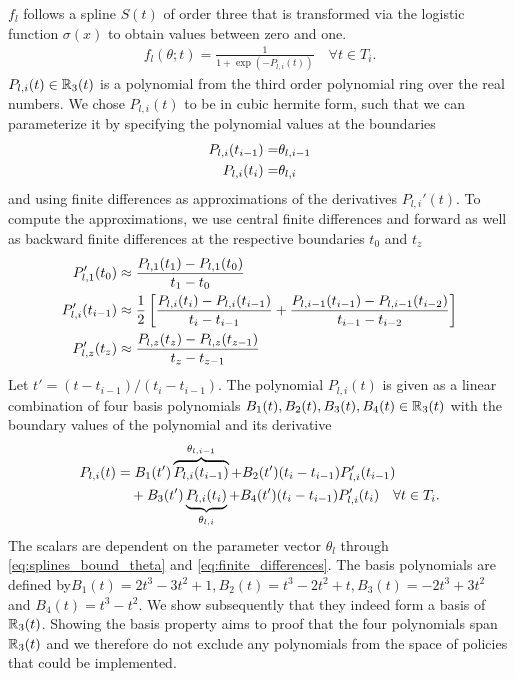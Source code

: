 $f_{l}$ follows a spline $S(t)$ of order three that is transformed via the logistic function $\sigma(x)$ to obtain values between zero and one.
\begin{align}
f_{l}(\theta; t) =  \frac{1}{1 + \exp{(-P_{l,i}(t))}} \quad \forall t \in T_i. 
\end{align}
$P_{l,i}(t) \in \mathbb{R}_3(t)$ is a polynomial from the third order polynomial ring over the real numbers. We chose $P_{l,i}(t)$ to be in cubic hermite form, such that we can parameterize it by specifying the polynomial values at the boundaries 
\begin{align}
\label{eq:splines_bound_theta}
P_{l,i}(t_{i-1}) =& \theta_{l, i-1} \\
P_{l,i}(t_{i})=& \theta_{l,i} \notag
\end{align}
and using finite differences as approximations of the derivatives $P_{l,i}'(t)$. To compute the approximations, we use central finite differences and forward as well as backward finite differences at the respective boundaries $t_0$ and $t_{z}$
\begin{align}
\label{eq:finite_differences}
P'_{l,1}(t_0) &\approx \frac{P_{l,1}(t_1) - P_{l,1}(t_0)}{t_1 - t_0} \\
P'_{l,i}(t_{i-1}) &\approx \frac{1}{2}\left[\frac{P_{l,i}(t_{i}) - P_{l,i}(t_{i-1})}{t_{i} - t_{i-1}} + \frac{P_{l,i-1}(t_{i-1}) - P_{l,i-1}( t_{i-2})}{t_{i-1} - t_{i-2}} \right] \notag \\
P'_{l,z}(t_{z}) &\approx \frac{P_{l,z}(t_{z}) - P_{l,z}(t_{z-1})}{t_{z} - t_{z-1}} \notag 
\end{align}
Let $t' = (t-t_{i-1})/(t_{i} - t_{i-1})$. The polynomial $P_{l,i}(t) $ is given as a linear combination of four basis polynomials  $B_1(t), B_2(t), B_3(t), B_4(t) \in \mathbb{R}_3(t)$ with the boundary values of the polynomial and its derivative
\begin{align}
P_{l,i}(t) &= B_1(t') \overbrace{P_{l,i}(t_{i-1})}^{\theta_{l,i-1}} + B_2(t') (t_{i} - t_{i-1}) P'_{l,i}(t_{i-1})  \\& \quad + B_3(t') \underbrace{P_{l,i}(t_{i})}_{\theta_{l,i}} + B_4(t') (t_{i} - t_{i-1}) P'_{l,i}(t_{i}) \quad \forall t \in T_i. \notag
\end{align}
The scalars are dependent on the parameter vector $\theta_l$ through \eqref{eq:splines_bound_theta} and \eqref{eq:finite_differences}. The basis polynomials are defined by$B_1(t) = 2t^3 - 3t^2 +1, B_2(t) = t^3 - 2t^2 +t, B_3(t) = -2t^3 + 3t^2$ and $B_4(t) = t^3 - t^2$. We show subsequently that they indeed form a basis of $\mathbb{R}_3(t)$. Showing the basis property aims to proof that the four polynomials span $\mathbb{R}_3(t)$ and we therefore do not exclude any polynomials from the space of policies that could be implemented.
